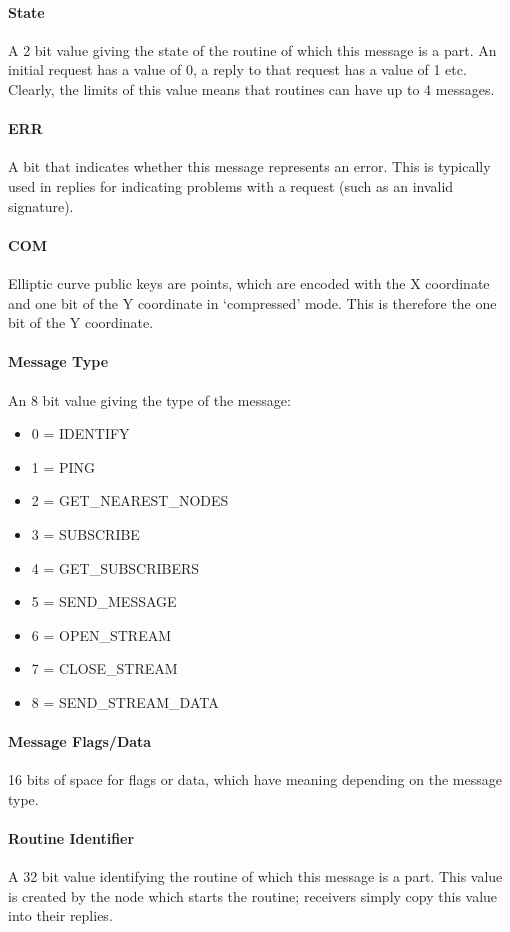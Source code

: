 \documentclass{article}
\begin{document}
\paragraph{State}
A 2 bit value giving the state of the routine of which this message is a part. An initial request has a value of 0, a reply to that request has a value of 1 etc. Clearly, the limits of this value means that routines can have up to 4 messages.

\paragraph{ERR}
A bit that indicates whether this message represents an error. This is typically used in replies for indicating problems with a request (such as an invalid signature).

\paragraph{COM}
Elliptic curve public keys are points, which are encoded with the X coordinate and one bit of the Y coordinate in `compressed' mode. This is therefore the one bit of the Y coordinate.

\paragraph{Message Type}
An 8 bit value giving the type of the message:

\begin{itemize}
\item 0 = IDENTIFY
\item 1 = PING
\item 2 = GET\_NEAREST\_NODES
\item 3 = SUBSCRIBE
\item 4 = GET\_SUBSCRIBERS
\item 5 = SEND\_MESSAGE
\item 6 = OPEN\_STREAM
\item 7 = CLOSE\_STREAM
\item 8 = SEND\_STREAM\_DATA
\end{itemize}

\paragraph{Message Flags/Data}
16 bits of space for flags or data, which have meaning depending on the message type.

\paragraph{Routine Identifier}
A 32 bit value identifying the routine of which this message is a part. This value is created by the node which starts the routine; receivers simply copy this value into their replies.
\end{document}
